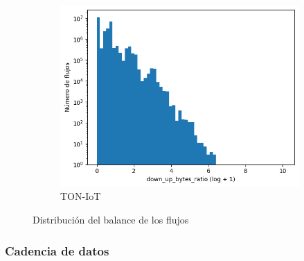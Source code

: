 \begin{figure}[H]
\begin{subfigure}[b]{0.32\textwidth}
        \centering
        \includegraphics[width=\linewidth]{media/packet_pincer_toniot/down_up_bytes_ratio_log_x_log_y.png}
        \caption{TON-IoT}
    \end{subfigure}
       \caption{Distribución del balance de los flujos}
       \label{fig:packet_pincer_down_up_bytes_ratio}
\end{figure}

\subsubsection{Cadencia de datos}

